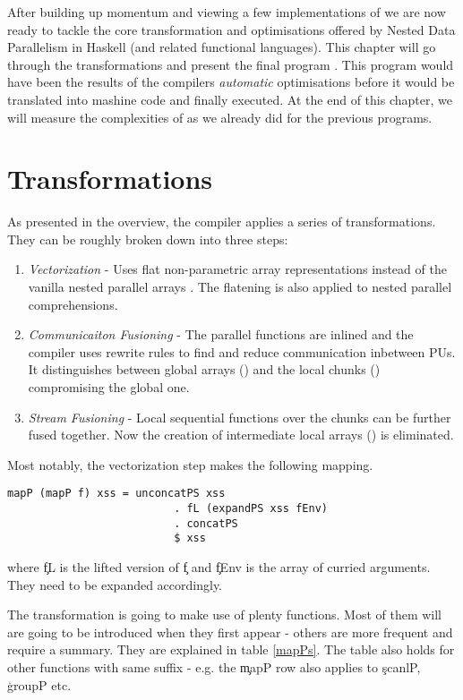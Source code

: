 

After building up momentum and viewing a few implementations of \algo
we are now ready to tackle the core transformation and optimisations
offered by Nested Data Parallelism in Haskell (and related functional languages).
This chapter will go through the transformations and present the
final program \ndpv. This program would have been the results of the compilers \textit{automatic}
optimisations before it would be translated into mashine code and finally executed.
At the end of this chapter, we will measure the complexities of \ndpv as we already did for the previous programs.

\section{Transformations}
  As presented in the overview, the compiler applies a series of transformations. They can be
  roughly broken down into three steps:
  \begin{enumerate}
    \item \emph{Vectorization} - Uses flat non-parametric array \pav representations instead of the
          vanilla nested parallel arrays \pan . The flatening is also applied to nested parallel comprehensions.
    \item \emph{Communicaiton Fusioning} - The parallel functions are inlined and the compiler uses rewrite rules to
          find and reduce communication inbetween PUs. It distinguishes between global arrays (\pav) and the local chunks (\pad)
          compromising the global one.
    \item \emph{Stream Fusioning} - Local sequential functions over the chunks can be further fused together. Now
          the creation of intermediate local arrays (\pad) is eliminated.
  \end{enumerate}
  
  Most notably, the vectorization step makes the following mapping.
  \begin{lstlisting}
mapP (mapP f) xss = unconcatPS xss
                          . fL (expandPS xss fEnv)
                          . concatPS
                          $ xss
  \end{lstlisting}
  where \c{fL} is the lifted version of \c{f} and \c{fEnv} is
  the array of curried arguments. They need to be expanded accordingly.
  
  The transformation is going to make use of plenty functions. Most of them will are going to be
  introduced when they first appear - others are more frequent and require a summary. They are explained in table \ref{mapPs}.
  The table also holds for other functions with same suffix - e.g. the \c{mapP} row also applies to \c{scanlP}, \c{groupP} etc.
  
